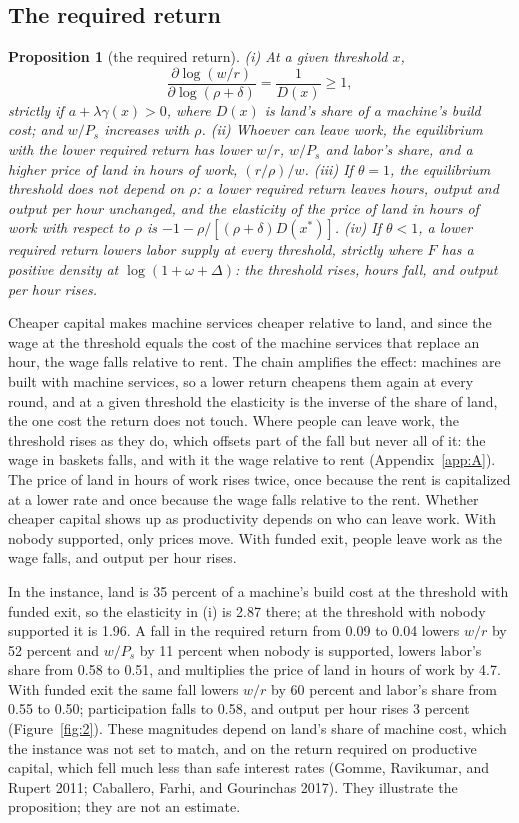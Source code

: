 \documentclass[12pt]{article}
\theoremstyle{plain}
\newtheorem{proposition}{Proposition}
\begin{document}
\subsection{The required return}\label{sec:4.3}

\begin{proposition}[the required return]\label{prop:3}
(i) At a given threshold $x$,
\[
\frac{\partial\log(w/r)}{\partial\log(\rho+\delta)}=\frac{1}{D(x)}\ge1,
\]
strictly if $a+\lambda\gamma(x)>0$, where $D(x)$ is land's share of a machine's build cost; and $w/P_s$ increases with $\rho$.
(ii) Whoever can leave work, the equilibrium with the lower required return has lower $w/r$, $w/P_s$ and labor's share, and a higher price of land in hours of work, $(r/\rho)/w$.
(iii) If $\theta=1$, the equilibrium threshold does not depend on $\rho$: a lower required return leaves hours, output and output per hour unchanged, and the elasticity of the price of land in hours of work with respect to $\rho$ is $-1-\rho/[(\rho+\delta)D(x^*)]$.
(iv) If $\theta<1$, a lower required return lowers labor supply at every threshold, strictly where $F$ has a positive density at $\log(1+\omega+\Delta)$: the threshold rises, hours fall, and output per hour rises.
\end{proposition}

Cheaper capital makes machine services cheaper relative to land, and since the wage at the threshold equals the cost of the machine services that replace an hour, the wage falls relative to rent. The chain amplifies the effect: machines are built with machine services, so a lower return cheapens them again at every round, and at a given threshold the elasticity is the inverse of the share of land, the one cost the return does not touch. Where people can leave work, the threshold rises as they do, which offsets part of the fall but never all of it: the wage in baskets falls, and with it the wage relative to rent (Appendix~\ref{app:A}). The price of land in hours of work rises twice, once because the rent is capitalized at a lower rate and once because the wage falls relative to the rent. Whether cheaper capital shows up as productivity depends on who can leave work. With nobody supported, only prices move. With funded exit, people leave work as the wage falls, and output per hour rises.

In the instance, land is 35 percent of a machine's build cost at the threshold with funded exit, so the elasticity in (i) is 2.87 there; at the threshold with nobody supported it is 1.96. A fall in the required return from 0.09 to 0.04 lowers $w/r$ by 52 percent and $w/P_s$ by 11 percent when nobody is supported, lowers labor's share from 0.58 to 0.51, and multiplies the price of land in hours of work by 4.7. With funded exit the same fall lowers $w/r$ by 60 percent and labor's share from 0.55 to 0.50; participation falls to 0.58, and output per hour rises 3 percent (Figure~\ref{fig:2}). These magnitudes depend on land's share of machine cost, which the instance was not set to match, and on the return required on productive capital, which fell much less than safe interest rates (Gomme, Ravikumar, and Rupert 2011; Caballero, Farhi, and Gourinchas 2017). They illustrate the proposition; they are not an estimate.
\end{document}

